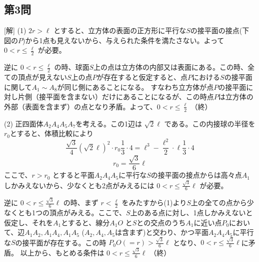 \documentclass[../main.tex]{subfiles}
\begin{document}
\subsection*{第3問}
[解] (1) $2r > \ell$ とすると、立方体の表面の正方形に平行な$S$の接平面の接点(下図の$P$)から1点も見えないから、与えられた条件を満たさない。よって $0 < r \le \frac{\ell}{2}$ が必要。

逆に $0 < r \le \frac{\ell}{2}$ の時、球面$S$上の点は立方体の内部又は表面にある。この時、全ての頂点が見えない$S$上の点$P$が存在すると仮定すると、点$P$における$S$の接平面に関して$A_1 \sim A_8$が同じ側にあることになる。
すなわち立方体が点$P$の接平面に対し片側（接平面を含まない）だけにあることになるが、この時点$P$は立方体の外部（表面を含まず）の点となり矛盾。よって、$0 < r \le \frac{\ell}{2}$ （終）

(2) 正四面体$A_2 A_4 A_5 A_7$を考える。この1辺は $\sqrt{2}\ell$ である。この内接球の半径を$r_0$とすると、体積比較により
\[ \frac{\sqrt{3}}{4}(\sqrt{2}\ell)^2 \cdot r_0 \frac{1}{3} \cdot 4 = \ell^3 - \frac{\ell^2}{2} \cdot \ell \frac{1}{3} \cdot 4 \]
\[ r_0 = \frac{\sqrt{3}}{6}\ell \]
ここで、$r > r_0$ とすると平面$A_2 A_4 A_5$に平行な$S$の接平面の接点からは高々点$A_1$しかみえないから、少なくとも2点がみえるには $0 < r \le \frac{\sqrt{3}}{6}\ell$ が必要。

逆に $0 < r \le \frac{\sqrt{3}}{6}\ell$ の時、まず $r < \frac{\ell}{2}$ をみたすから(1)より$S$上の全ての点から少なくとも1つの頂点がみえる。ここで、$S$上のある点に対し、1点しかみえないと仮定し、それを$A_1$とすると、線分$A_1 O$ と$S$との交点のうち$A_1$に近い点$P_0$において、辺$A_1A_2, A_1A_4, A_1A_5$ ($A_2, A_4, A_5$は含まず)と交わり、かつ平面$A_2 A_4 A_5$に平行な$S$の接平面が存在する。この時 $P_0O (=r) > \frac{\sqrt{3}}{6}\ell$ となり、$0 < r \le \frac{\sqrt{3}}{6}\ell$に矛盾。
以上から、もとめる条件は $0 < r \le \frac{\sqrt{3}}{6}\ell$ （終）

\begin{center}
\end{center}
\end{document}
